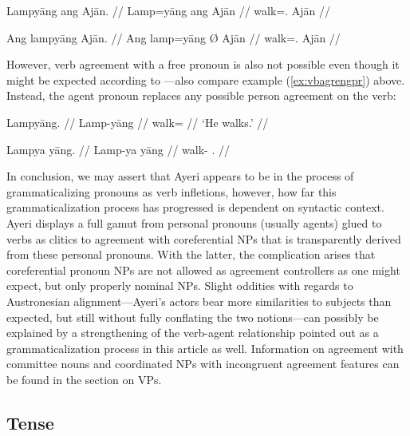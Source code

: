 \pex %
\a\ljudge* \begingl
	\gla Lampyāng ang Ajān. //
	\glb Lamp=yāng ang ​Ajān //
	\glc walk=\TsgM{}.\Aarg{} \Aarg{} Ajān //
\endgl

\a\ljudge* \begingl	
	\gla Ang lampyāng {} Ajān. //
	\glb Ang lamp=yāng Ø ​Ajān //
	\glc \AgtT{} walk=\TsgM{}.\Aarg{} \Top{} ​Ajān //
\endgl

\xe

However, verb agreement with a free pronoun is also not possible even though it 
might be expected according to \citep[109]{corbett2006}---also compare 
example (\ref{ex:vbagrengpr}) above. Instead, the agent pronoun replaces any 
possible person agreement on the verb:

\pex %
\a\begingl
	\gla Lampyāng. //
	\glb Lamp-yāng //
	\glc walk=\TsgM{} //
	\glft `He walks.' //
\endgl

\a\ljudge* \begingl	
	\gla Lampya yāng. //
	\glb Lamp-ya yāng //
	\glc walk-\TsgM{} \TsgM{}.\Aarg{} //
\endgl

\xe

In conclusion, we may assert that Ayeri appears to be in the process of 
grammaticalizing pronouns as verb infletions, however, how far this 
grammaticalization process has progressed is dependent on syntactic context. 
Ayeri displays a full gamut from personal pronouns (usually agents) glued to 
verbs as clitics to agreement with coreferential NPs that is transparently 
derived from these personal pronouns. With the latter, the complication 
arises that coreferential pronoun NPs are not allowed as agreement 
controllers as one might expect, but only properly nominal NPs. Slight oddities 
with regards to Austronesian alignment---Ayeri's actors bear more similarities 
to subjects than expected, but still without fully conflating the two 
notions---can possibly be explained by a strengthening of the verb-agent 
relationship pointed out as a grammaticalization process in this article as 
well. Information on agreement with committee nouns and coordinated NPs with 
incongruent agreement features can be found in the section on VPs.


\subsection{Tense}

